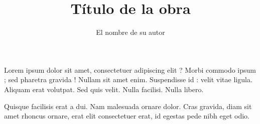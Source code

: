 \documentclass[12pt,a4paper]{book}
\begin{document}
\title{Título de la obra}
\author{El nombre de su autor}

\maketitle

Lorem ipsum dolor sit amet, consectetuer adipiscing elit ?
Morbi commodo ipsum ; sed pharetra gravida !
Nullam sit amet enim. Suspendisse id : velit vitae ligula.
Aliquam erat volutpat.
Sed quis velit. Nulla facilisi. Nulla libero. 

Quisque facilisis erat a dui.
Nam malesuada ornare dolor.
Cras gravida, diam sit amet rhoncus ornare, 
erat   elit consectetuer erat, id egestas pede nibh eget odio.
\end{document}
